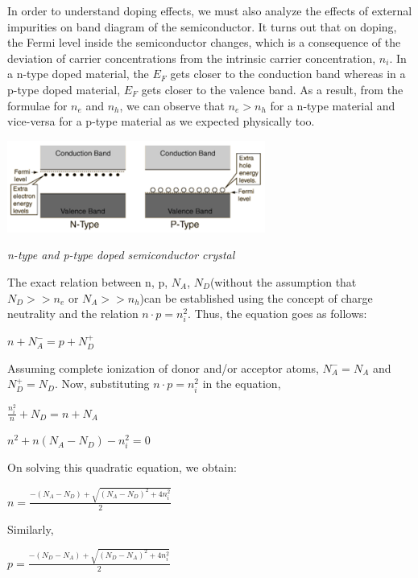 \documentclass[12 pt]{article}
\begin{document}
In order to understand doping effects, we must also analyze the effects of external impurities on band diagram of the semiconductor. It turns out that on doping, the Fermi level inside the semiconductor changes, which is a consequence of the deviation of carrier concentrations from the intrinsic carrier concentration, $n_{i}$. In a n-type doped material, the $E_{F}$ gets closer to the conduction band whereas in a p-type doped material, $E_{F}$ gets closer to the valence band. As a result, from the formulae for $n_{e}$ and $n_{h}$, we can observe that $n_{e} > n_{h}$ for a n-type material and vice-versa for a p-type material as we expected physically too.\newline

  \par
   \begin{center}
  \includegraphics{doping_2_85.png}
  \end{center}
    \begin{center}
      \emph{n-type and p-type doped semiconductor crystal}
  \end{center}
\par

The exact relation between n, p, $N_{A}$, $N_{D}$(without the assumption that $N_{D} >> n_{e}$ or $N_{A} >> n_{h}$)can be established using the concept of charge neutrality and the relation $n\cdot p = n_{i}^{2}$. Thus, the equation goes as follows:
\begin{center}
    $n + N_{A}^{-} = p + N_{D}^{+}  $
\end{center}
Assuming complete ionization of donor and/or acceptor atoms, $N_{A}^{-} = N_{A}$ and $N_{D}^{+} = N_{D}$. Now, substituting $n\cdot p = n_{i}^{2}$ in the equation,

\begin{center}
    $ \frac{n_{i}^{2}}{n} + N_{D} = n + N_{A}  $
\end{center}

\begin{center}
    $ n^{2} + n(N_{A}-N_{D}) - n_{i}^{2} = 0  $
\end{center}

On solving this quadratic equation, we obtain:
\begin{center}
    $ n =  \frac{-(N_{A}-N_{D})+\sqrt{(N_{A}-N_{D})^{2}+4n_{i}^{2}}}{2}$
\end{center}
Similarly,
\begin{center}
    $ p =  \frac{-(N_{D}-N_{A})+\sqrt{(N_{D}-N_{A})^{2}+4n_{i}^{2}}}{2}$
\end{center}\par
\end{document}
